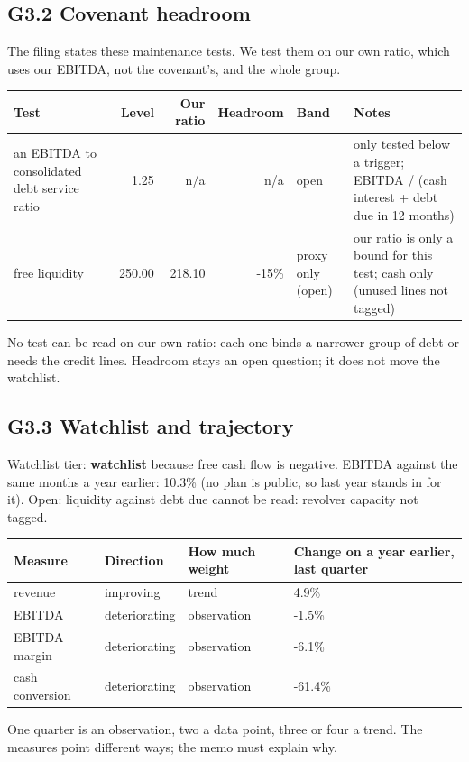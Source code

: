 \documentclass[11pt,a4paper]{article}
\begin{document}
\subsection*{G3.2 Covenant headroom}
The filing states these maintenance tests. We test them on our own ratio, which uses our EBITDA, not the covenant's, and the whole group.
\begin{center}\footnotesize\setlength{\tabcolsep}{3.5pt}\begin{tabular}{@{}p{3.8cm}rrrp{1.9cm}p{4.4cm}@{}}\toprule
Test & Level & Our ratio & Headroom & Band & Notes \\\midrule
an EBITDA to consolidated debt service ratio & 1.25 & n/a & n/a & open & only tested below a trigger; EBITDA / (cash interest + debt due in 12 months) \\
free liquidity & 250.00 & 218.10 & -15\% & proxy only (open) & our ratio is only a bound for this test; cash only (unused lines not tagged) \\
\bottomrule\end{tabular}\end{center}
No test can be read on our own ratio: each one binds a narrower group of debt or needs the credit lines. Headroom stays an open question; it does not move the watchlist.
\subsection*{G3.3 Watchlist and trajectory}
Watchlist tier: \textbf{watchlist} because free cash flow is negative. EBITDA against the same months a year earlier: 10.3\% (no plan is public, so last year stands in for it). Open: liquidity against debt due cannot be read: revolver capacity not tagged.
\begin{center}\footnotesize\setlength{\tabcolsep}{3.5pt}\begin{tabular}{@{}llll@{}}\toprule
Measure & Direction & How much weight & Change on a year earlier, last quarter \\\midrule
revenue & improving & trend & 4.9\% \\
EBITDA & deteriorating & observation & -1.5\% \\
EBITDA margin & deteriorating & observation & -6.1\% \\
cash conversion & deteriorating & observation & -61.4\% \\
\bottomrule\end{tabular}\end{center}
One quarter is an observation, two a data point, three or four a trend. The measures point different ways; the memo must explain why.
\end{document}
